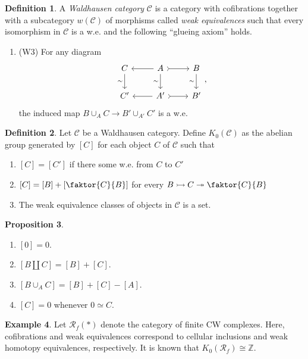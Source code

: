 \documentclass[10pt,letterpaper,cm]{nupset}
\theoremstyle{definition}
\newtheorem{definition}{Definition}[section]
\newtheorem{exmp}[definition]{Example}
\theoremstyle{theorem}
\newtheorem{prop}[definition]{Proposition}
\theoremstyle{remark}
\newcommand{\Z}{\mathbb Z}
\newcommand{\1}{\mathbf{1}}
\renewcommand{\c}{\mathscr{C}}
\newcommand{\0}{\vec 0}
\begin{document}
\begin{definition}
A \textit{Waldhausen category} $\c$ is a category with cofibrations together with a subcategory $w(\c)$ of morphisms called \textit{weak equivalences} such that every isomorphism in $\c$ is a w.e. and the following ``glueing axiom'' holds.
\begin{enumerate}
\item (W3) For any diagram
\[
\begin{tikzcd}
C \arrow[d, "\sim"'] & A \arrow[d, "\sim"'] \arrow[r, tail] \arrow[l] & B \arrow[d, "\sim"'] \\
C' & A' \arrow[r, tail] \arrow[l] & B'
\end{tikzcd}, \]
the induced map $B \cup_A C \to  B' \cup_{A'} C'$ is a w.e.
\end{enumerate}
\end{definition}

\begin{definition}
Let $\c$ be a Waldhausen category. Define $K_0(\c)$ as the abelian group generated by $[C]$ for each object $C$ of $\c$ such that
\begin{enumerate}
\item $[C] = [C']$ if there some w.e. from $C$ to $C'$
\item $[C] = [B] + \left[\faktor{C}{B}\right]$ for every $B \rightarrowtail  C \twoheadrightarrow \faktor{C}{B}$
\item The weak equivalence classes of objects in $\c$ is a set.
\end{enumerate}
\end{definition}

\begin{prop} $ $
\begin{enumerate}
\item $[0] = 0$.
\item $\left[B \coprod C\right] = [B] +[C]$.
\item $\left[B \cup_A C\right] = [B]+[C]-[A]$.
\item $[C]= 0$ whenever $0 \simeq C$.
\end{enumerate}
\end{prop}

\begin{exmp}
Let $\mathcal{R}_f(\ast)$ denote the category of finite CW complexes. Here, cofibrations and weak equivalences correspond to cellular inclusions  and weak homotopy equivalences, respectively. It is known that $K_0(\mathcal{R}_f) \cong \Z$.
\end{exmp}
\end{document}
